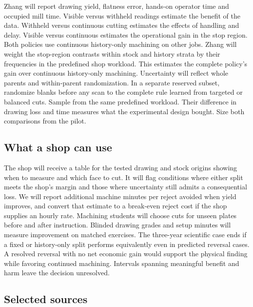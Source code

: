 \documentclass[11pt,letterpaper]{article}
\begin{document}
Zhang will report drawing yield, flatness error, hands-on operator time and occupied mill time. Visible versus withheld readings estimate the benefit of the data. Withheld versus continuous cutting estimates the effects of handling and delay. Visible versus continuous estimates the operational gain in the stop region. Both policies use continuous history-only machining on other jobs. Zhang will weight the stop-region contrasts within stock and history strata by their frequencies in the predefined shop workload. This estimates the complete policy's gain over continuous history-only machining. Uncertainty will reflect whole parents and within-parent randomization. In a separate reserved subset, randomize blanks before any scan to the complete rule learned from targeted or balanced cuts. Sample from the same predefined workload. Their difference in drawing loss and time measures what the experimental design bought. Size both comparisons from the pilot.

\subsection*{What a shop can use}

The shop will receive a table for the tested drawing and stock origins showing when to measure and which face to cut. It will flag conditions where either split meets the shop’s margin and those where uncertainty still admits a consequential loss. We will report additional machine minutes per reject avoided when yield improves, and convert that estimate to a break-even reject cost if the shop supplies an hourly rate. Machining students will choose cuts for unseen plates before and after instruction. Blinded drawing grades and setup minutes will measure improvement on matched exercises. The three-year scientific case ends if a fixed or history-only split performs equivalently even in predicted reversal cases. A resolved reversal with no net economic gain would support the physical finding while favoring continued machining. Intervals spanning meaningful benefit and harm leave the decision unresolved.

\subsection*{Selected sources}
\end{document}
